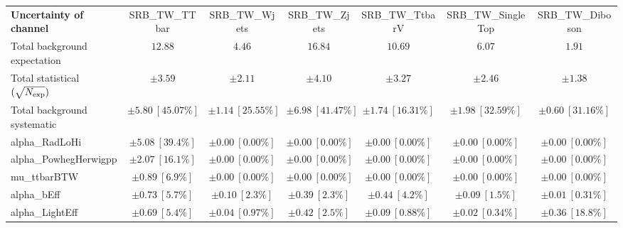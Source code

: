 
\begin{sidewaystable}
\begin{center}
\setlength{\tabcolsep}{0.0pc}
\begin{tabular*}{\textwidth}{@{\extracolsep{\fill}}lcccccc}
\noalign{\smallskip}\hline\noalign{\smallskip}
{\bf Uncertainty of channel}                                    & SRB\_TW\_TTbar            & SRB\_TW\_Wjets            & SRB\_TW\_Zjets            & SRB\_TW\_TtbarV            & SRB\_TW\_SingleTop            & SRB\_TW\_Diboson            \\
\noalign{\smallskip}\hline\noalign{\smallskip}
Total background expectation             &  $12.88$        &  $4.46$        &  $16.84$        &  $10.69$        &  $6.07$        &  $1.91$       \\
\noalign{\smallskip}\hline\noalign{\smallskip}
Total statistical $(\sqrt{N_{\rm exp}})$              & $\pm 3.59$        & $\pm 2.11$        & $\pm 4.10$        & $\pm 3.27$        & $\pm 2.46$        & $\pm 1.38$       \\
Total background systematic               & $\pm 5.80\ [45.07\%] $        & $\pm 1.14\ [25.55\%] $        & $\pm 6.98\ [41.47\%] $        & $\pm 1.74\ [16.31\%] $        & $\pm 1.98\ [32.59\%] $        & $\pm 0.60\ [31.16\%] $             \\
\noalign{\smallskip}\hline\noalign{\smallskip}
\noalign{\smallskip}\hline\noalign{\smallskip}
alpha\_RadLoHi         & $\pm 5.08\ [39.4\%] $          & $\pm 0.00\ [0.00\%] $          & $\pm 0.00\ [0.00\%] $          & $\pm 0.00\ [0.00\%] $          & $\pm 0.00\ [0.00\%] $          & $\pm 0.00\ [0.00\%] $       \\
alpha\_PowhegHerwigpp         & $\pm 2.07\ [16.1\%] $          & $\pm 0.00\ [0.00\%] $          & $\pm 0.00\ [0.00\%] $          & $\pm 0.00\ [0.00\%] $          & $\pm 0.00\ [0.00\%] $          & $\pm 0.00\ [0.00\%] $       \\
mu\_ttbarBTW         & $\pm 0.89\ [6.9\%] $          & $\pm 0.00\ [0.00\%] $          & $\pm 0.00\ [0.00\%] $          & $\pm 0.00\ [0.00\%] $          & $\pm 0.00\ [0.00\%] $          & $\pm 0.00\ [0.00\%] $       \\
alpha\_bEff         & $\pm 0.73\ [5.7\%] $          & $\pm 0.10\ [2.3\%] $          & $\pm 0.39\ [2.3\%] $          & $\pm 0.44\ [4.2\%] $          & $\pm 0.09\ [1.5\%] $          & $\pm 0.01\ [0.31\%] $       \\
alpha\_LightEff         & $\pm 0.69\ [5.4\%] $          & $\pm 0.04\ [0.97\%] $          & $\pm 0.42\ [2.5\%] $          & $\pm 0.09\ [0.88\%] $          & $\pm 0.02\ [0.34\%] $          & $\pm 0.36\ [18.8\%] $       \\

\end{tabular*}
\end{center}
\end{sidewaystable}
